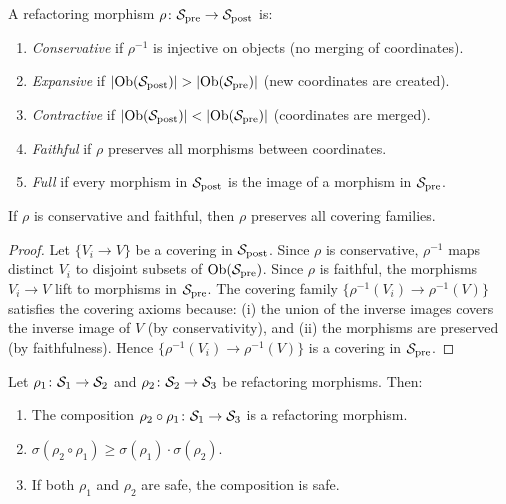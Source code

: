 \documentclass[11pt]{article}
\newcommand{\SitePre}{\Site_{\mathrm{pre}}}
\newcommand{\SitePost}{\Site_{\mathrm{post}}}
\newcommand{\RefactorMorph}{\rho}
\newcommand{\SafeDeg}{\sigma}                        %
\begin{document}
\begin{definition}\label{def:morph-classes}
A refactoring morphism $\RefactorMorph \colon \SitePre \to \SitePost$
is:
\begin{enumerate}[noitemsep]
  \item \emph{Conservative} if $\RefactorMorph^{-1}$ is injective on
        objects (no merging of coordinates).
  \item \emph{Expansive} if $|\Ob(\SitePost)| > |\Ob(\SitePre)|$
        (new coordinates are created).
  \item \emph{Contractive} if $|\Ob(\SitePost)| < |\Ob(\SitePre)|$
        (coordinates are merged).
  \item \emph{Faithful} if $\RefactorMorph$ preserves all morphisms
        between coordinates.
  \item \emph{Full} if every morphism in $\SitePost$ is the image of
        a morphism in $\SitePre$.
\end{enumerate}
\end{definition}

\begin{lemma}\label{lem:conservative-preserving}
If $\RefactorMorph$ is conservative and faithful, then $\RefactorMorph$
preserves all covering families.
\end{lemma}

\begin{proof}
Let $\{V_i \to V\}$ be a covering in $\SitePost$.  Since
$\RefactorMorph$ is conservative, $\RefactorMorph^{-1}$ maps distinct
$V_i$ to disjoint subsets of $\Ob(\SitePre)$.  Since $\RefactorMorph$
is faithful, the morphisms $V_i \to V$ lift to morphisms in $\SitePre$.
The covering family $\{\RefactorMorph^{-1}(V_i) \to
\RefactorMorph^{-1}(V)\}$ satisfies the covering axioms because:
(i) the union of the inverse images covers the inverse image of $V$
(by conservativity), and (ii) the morphisms are preserved (by
faithfulness).  Hence $\{\RefactorMorph^{-1}(V_i) \to
\RefactorMorph^{-1}(V)\}$ is a covering in $\SitePre$.
\end{proof}

\begin{theorem}\label{thm:refactor-composition}
Let $\RefactorMorph_1 \colon \Site_1 \to \Site_2$ and
$\RefactorMorph_2 \colon \Site_2 \to \Site_3$ be refactoring morphisms.
Then:
\begin{enumerate}[noitemsep]
  \item The composition $\RefactorMorph_2 \circ \RefactorMorph_1 \colon
        \Site_1 \to \Site_3$ is a refactoring morphism.
  \item $\SafeDeg(\RefactorMorph_2 \circ \RefactorMorph_1) \geq
        \SafeDeg(\RefactorMorph_1) \cdot \SafeDeg(\RefactorMorph_2)$.
  \item If both $\RefactorMorph_1$ and $\RefactorMorph_2$ are safe,
        the composition is safe.
\end{enumerate}
\end{theorem}
\end{document}
